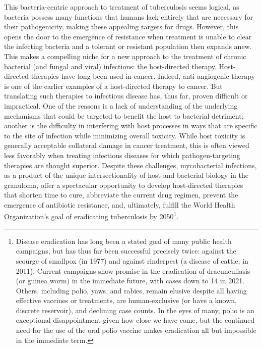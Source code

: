 This bacteria-centric approach to treatment of tuberculosis seems logical, as bacteria possess many functions that humans lack entirely that are necessary for their pathogenicity, making these appealing targets for drugs. However, this opens the door to the emergence of resistance when treatment is unable to clear the infecting bacteria and a tolerant or resistant population then expands anew. This makes a compelling niche for a new approach to the treatment of chronic bacterial (and fungal and viral) infections: the host-directed therapy. Host-directed therapies have long been used in cancer. Indeed, anti-angiogenic therapy is one of the earlier examples of a host-directed therapy to cancer. But  translating such therapies to infectious disease has, thus far, proven difficult or impractical. One of the reasons is a lack of understanding of the underlying mechanisms that could be targeted to benefit the host to bacterial detriment; another is the difficulty in interfering with host processes in ways that are specific to the site of infection while minimizing overall toxicity. While host toxicity is generally acceptable collateral damage in cancer treatment, this is often viewed less favorably when treating infectious diseases for which pathogen-targeting therapies are thought superior. Despite these challenges, mycobacterial infections, as a product of the unique intersectionality of host and bacterial biology in the granuloma, offer a spectacular opportunity to develop host-directed therapies that shorten time to cure, abbreviate the current drug regimen, prevent the emergence of antibiotic resistance, and, ultimately, fulfill the World Health Organization's goal of eradicating tuberculosis by 2050\footnote{Disease eradication has long been a stated goal of many public health campaigns, but has thus far been successful precisely twice: against the scourge of smallpox (in 1977) and against rinderpest (a disease of cattle, in 2011). Current campaigns show promise in the eradication of dracunculiasis (or guinea worm) in the immediate future, with cases down to 14 in 2021. Others, including polio, yaws, and rabies, remain elusive despite all having effective vaccines or treatments, are human-exclusive (or have a known, discrete reservoir), and declining case counts. In the eyes of many, polio is an exceptional disappointment given how close we have come, but the continued need for the use of the oral polio vaccine makes eradication all but impossible in the immediate term.}. 

